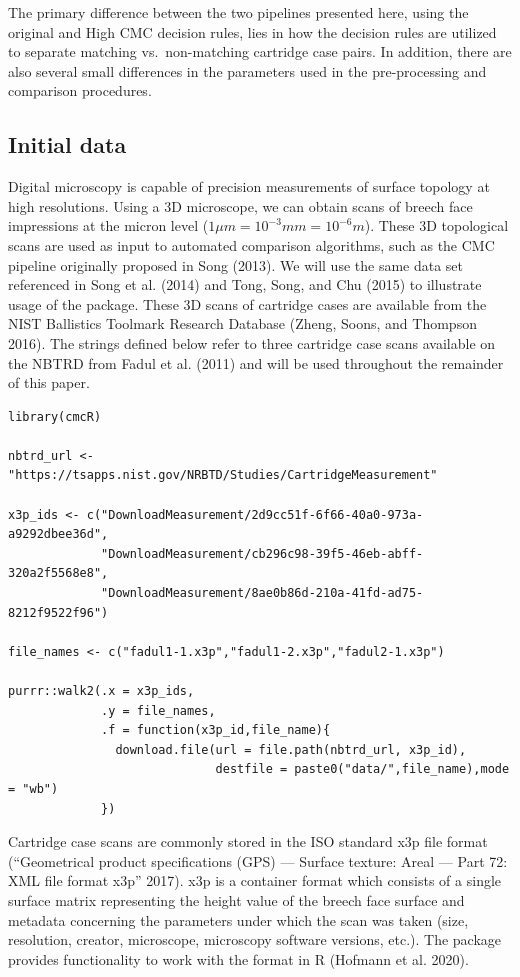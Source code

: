 The primary difference between the two pipelines presented here, using the original and High CMC decision rules, lies in how the decision rules are utilized to separate matching vs.~non-matching cartridge case pairs.
In addition, there are also several small differences in the parameters used in the pre-processing and comparison procedures.

\hypertarget{initialData}{%
\subsection{Initial data}\label{initialData}}

Digital microscopy is capable of precision measurements of surface topology at high resolutions.
Using a 3D microscope, we can obtain scans of breech face impressions at the micron level (\(1 \mu m = 10^{-3} mm = 10^{-6} m\)).
These 3D topological scans are used as input to automated comparison algorithms, such as the CMC pipeline originally proposed in Song (2013).
We will use the same data set referenced in Song et al. (2014) and Tong, Song, and Chu (2015) to illustrate usage of the  package.
These 3D scans of cartridge cases are available from the NIST Ballistics Toolmark Research Database (Zheng, Soons, and Thompson 2016).
The strings defined below refer to three cartridge case scans available on the NBTRD from Fadul et al. (2011) and will be used throughout the remainder of this paper.

\begin{verbatim}
library(cmcR)

nbtrd_url <- "https://tsapps.nist.gov/NRBTD/Studies/CartridgeMeasurement"

x3p_ids <- c("DownloadMeasurement/2d9cc51f-6f66-40a0-973a-a9292dbee36d",
             "DownloadMeasurement/cb296c98-39f5-46eb-abff-320a2f5568e8",
             "DownloadMeasurement/8ae0b86d-210a-41fd-ad75-8212f9522f96")

file_names <- c("fadul1-1.x3p","fadul1-2.x3p","fadul2-1.x3p")

purrr::walk2(.x = x3p_ids,
             .y = file_names,
             .f = function(x3p_id,file_name){
               download.file(url = file.path(nbtrd_url, x3p_id),
                             destfile = paste0("data/",file_name),mode = "wb")
             })
\end{verbatim}

Cartridge case scans are commonly stored in the ISO standard x3p file format ({``{Geometrical product specifications (GPS) --- Surface texture: Areal --- Part 72: XML file format x3p}''} 2017).
x3p is a container format which consists of a single surface matrix representing the height value of the breech face surface and metadata concerning the parameters under which the scan was taken (size, resolution, creator, microscope, microscopy software versions, etc.).
The  package provides functionality to work with the format in R (Hofmann et al. 2020).

